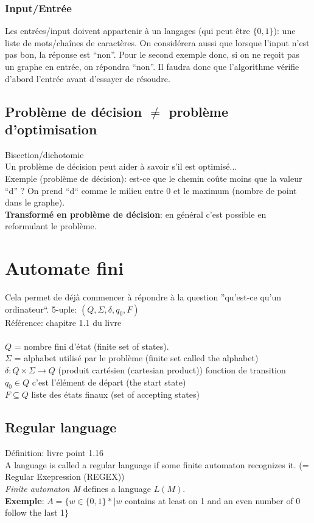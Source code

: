 \documentclass[a4paper,12pt]{article}
\begin{document}
    \subsubsection{Input/Entrée}
      Les entrées/input doivent appartenir à un langages (qui peut être $\{0, 1\}$): une liste de mots/chaînes de caractères.  On considérera aussi que lorsque l'input n'est pas bon, la réponse est ``non''.  Pour le second exemple donc, si on ne reçoit pas un graphe en entrée, on répondra ``non''. Il faudra donc que l'algorithme vérifie d'abord l'entrée avant d'essayer de résoudre.

  \subsection{Problème de décision $\neq$ problème d'optimisation}
    Bisection/dichotomie\\
    Un problème de décision peut aider à savoir s'il est optimisé...\\
    Exemple (problème de décision): est-ce que le chemin coûte moins que la valeur ``d'' ?
    On prend ``d`` comme le milieu entre 0 et le maximum (nombre de point dans le graphe).\\
    \textbf{Transformé en problème de décision}: en général c'est possible en reformulant le problème.

\section{Automate fini}
  Cela permet de déjà commencer à répondre à la question ''qu'est-ce qu'un ordinateur``.
  5-uple: $(Q, \Sigma, \delta, q_0, F)$\\
  Référence: chapitre 1.1 du livre\\
  \\
  $Q$ = nombre fini d'état (finite set of states).\\
  $\Sigma$ = alphabet utilisé par le problème (finite set called the alphabet)\\
  $\delta : Q \times \Sigma \rightarrow Q$ (produit cartésien (cartesian product)) fonction de transition\\
  $q_0 \in Q$ c'est l'élément de départ (the start state)\\
  $F \subseteq Q$ liste des états finaux (set of accepting states)\\

  \subsection{Regular language}
    Définition: livre point 1.16\\
    A language is called a regular language if some finite automaton recognizes it. (= Regular Exepression (REGEX))\\
    \textit{Finite automaton M} defines a language $L(M)$.\\
    \textbf{Exemple}: $A = \{w \in \{0, 1\}* | w$ contains at least on 1 and an even number of 0 follow the last 1$\}$
\end{document}
